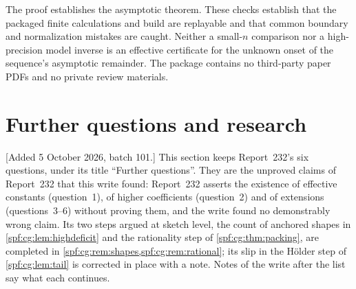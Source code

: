 \documentclass[11pt]{article}
\numberwithin{equation}{section}
\theoremstyle{definition}
\theoremstyle{remark}
\theoremstyle{definition}
\begin{document}
The proof establishes the asymptotic theorem. These checks establish that
the packaged finite calculations and build are replayable and that common
boundary and normalization mistakes are caught. Neither a small-$n$
comparison nor a high-precision model inverse is an effective certificate
for the unknown onset of the sequence's asymptotic remainder. The package
contains no third-party paper PDFs and no private review materials.

\section{Further questions and research}
\label{spf:cg:sec:questions}

[Added 5 October 2026, batch 101.] This section keeps Report~232's six
questions, under its title ``Further questions''. They are the unproved
claims of Report~232 that this write found: Report~232 asserts the existence
of effective constants (question~1), of higher coefficients (question~2) and
of extensions (questions~3--6) without proving them, and the write found no
demonstrably wrong claim. Its two steps argued at sketch level, the count of
anchored shapes in \cref{spf:cg:lem:highdeficit} and the rationality step of
\cref{spf:cg:thm:packing}, are completed in
\cref{spf:cg:rem:shapes,spf:cg:rem:rational}; its slip in the H\"older step
of \cref{spf:cg:lem:tail} is corrected in place with a note. Notes of the
write after the list say what each continues.
\end{document}
